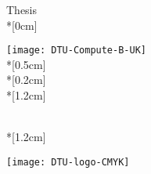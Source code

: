 %
\thispagestyle{empty}             %
\sffamily
\begin{flushright}
    \thesistypeabbr{} Thesis\\*[0cm]
    \thesistype{}
\end{flushright}
\vspace*{\fill}
\texttt{[image: DTU-Compute-B-UK]}\\*[0.5cm]
\Huge \thesistitle{}\\*[0.2cm]
\Large \thesissubtitle{}\\*[1.2cm]
\parbox[b]{0.5\linewidth}{%
    \LARGE 
    \thesisauthor{}\\*[1.2cm]
    \Large
    \thesislocation{} \the\year
}
\hfill\texttt{[image: DTU-logo-CMYK]}
\normalfont
\normalsize
